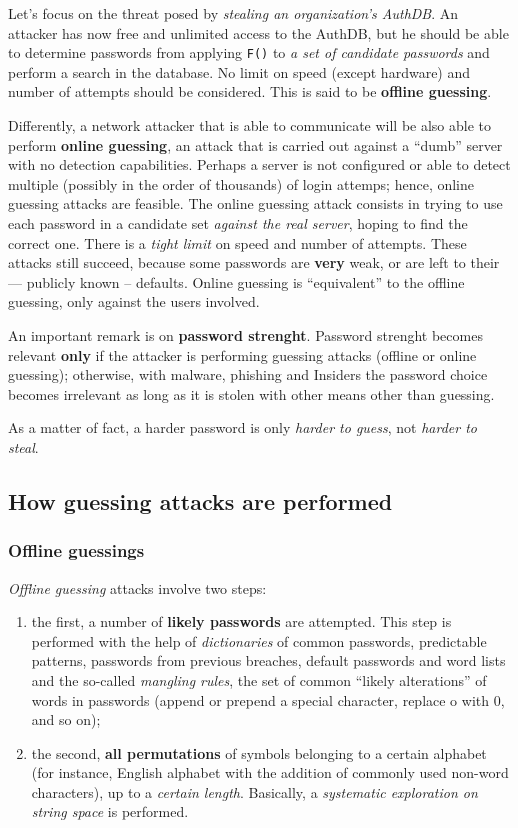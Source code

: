\documentclass[10pt]{extreport}
\begin{document}
Let's focus on the threat posed by \emph{stealing an organization's AuthDB}. An
attacker has now free and unlimited access to the AuthDB, but he should be able
to determine passwords from applying \texttt{F()} to \emph{a set of candidate
passwords} and perform a search in the database. No limit on speed (except
hardware) and number of attempts should be considered. This is said to be
\textbf{offline guessing}.

Differently, a network attacker that is able to communicate will be also able
to perform \textbf{online guessing}, an attack that is carried out against a
``dumb'' server with no detection capabilities. Perhaps a server is not
configured or able to detect multiple (possibly in the order of thousands) of
login attemps; hence, online guessing attacks are feasible. The online guessing
attack consists in trying to use each password in a candidate set \emph{against
the real server}, hoping to find the correct one. There is a \emph{tight limit}
on speed and number of attempts. These attacks still succeed, because some
passwords are \textbf{very} weak, or are left to their --- publicly known --
defaults. Online guessing is ``equivalent'' to the offline guessing, only
against the users involved.

An important remark is on \textbf{password strenght}. Password strenght becomes
relevant \textbf{only} if the attacker is performing guessing attacks (offline
or online guessing); otherwise, with malware, phishing and Insiders the
password choice becomes irrelevant as long as it is stolen with other means
other than guessing.

As a matter of fact, a harder password is only \emph{harder to guess}, not \emph{harder
to steal}.


\subsection{How guessing attacks are performed}

\subsubsection{Offline guessings}
\emph{Offline guessing} attacks involve two steps:
\begin{enumerate}
    \item the first, a number of \textbf{likely passwords} are attempted. This
        step is performed with the help of \emph{dictionaries} of common
        passwords, predictable patterns, passwords from previous breaches,
        default passwords and word lists and the so\--called \emph{mangling
        rules}, the set of common ``likely alterations'' of words in passwords
        (append or prepend a special character, replace o with 0, and so on);
    \item the second, \textbf{all permutations} of symbols belonging to a
        certain alphabet (for instance, English alphabet with the addition of
        commonly used non\--word characters), up to a \emph{certain length}.
        Basically, a \emph{systematic exploration on string space} is
        performed.
\end{enumerate}
\end{document}
